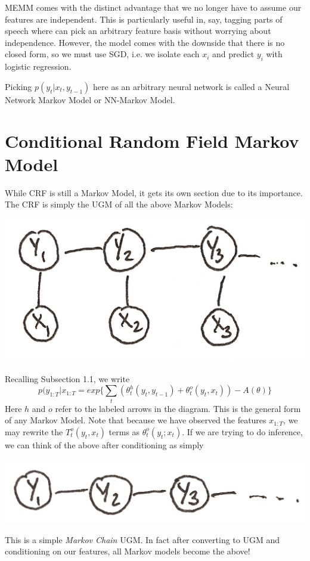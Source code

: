 \documentclass{article}
\begin{document}
MEMM comes with the distinct advantage that we no longer have to assume our features are independent. This is particularly useful in, say, tagging parts of speech where can pick an arbitrary feature basis without worrying about independence. However, the model comes with the downside that there is no closed form, so we must use SGD, i.e. we isolate each $x_i$ and predict $y_i$ with logistic regression.

Picking $p(y_t|x_t,y_{t-1})$ here as an arbitrary neural network is called a Neural Network Markov Model or NN-Markov Model. 
\section{Conditional Random Field Markov Model}
While CRF is still a Markov Model, it gets its own section due to its importance. The CRF is simply the UGM of all the above Markov Models:
\begin{center}
\includegraphics[scale=.1]{CRF} 
\end{center}
Recalling Subsection 1.1, we write
\[
p(y_{1:T}|x_{1:T} = exp\{\sum\limits_{t}(\theta_t^h(y_t,y_{t-1})+\theta_t^o(y_t,x_t)) - A(\theta) \}
\]
Here $h$ and $o$ refer to the labeled arrows in the diagram.
This is the general form of any Markov Model. Note that because we have observed the features $x_{1:T}$, we may rewrite the $T_t^o(y_t,x_t)$ terms as $\theta_t^o(y_t;x_t)$. If we are trying to do inference, we can think of the above after conditioning as simply
\begin{center}
\includegraphics[scale=.1]{M_chain} 
\end{center}
This is a simple \textit{Markov Chain} UGM. In fact after converting to UGM and conditioning on our features, all Markov models become the above! 
\end{document}
